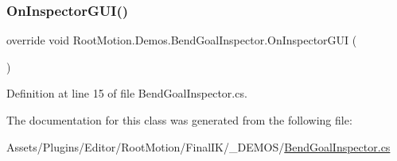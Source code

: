 \subsubsection{\texorpdfstring{On\+Inspector\+G\+U\+I()}{OnInspectorGUI()}}
{\footnotesize\ttfamily override void Root\+Motion.\+Demos.\+Bend\+Goal\+Inspector.\+On\+Inspector\+G\+UI (\begin{DoxyParamCaption}{ }\end{DoxyParamCaption})}



Definition at line 15 of file Bend\+Goal\+Inspector.\+cs.



The documentation for this class was generated from the following file\+:\begin{DoxyCompactItemize}
\item 
Assets/\+Plugins/\+Editor/\+Root\+Motion/\+Final\+I\+K/\+\_\+\+D\+E\+M\+O\+S/\mbox{\hyperlink{_bend_goal_inspector_8cs}{Bend\+Goal\+Inspector.\+cs}}\end{DoxyCompactItemize}
